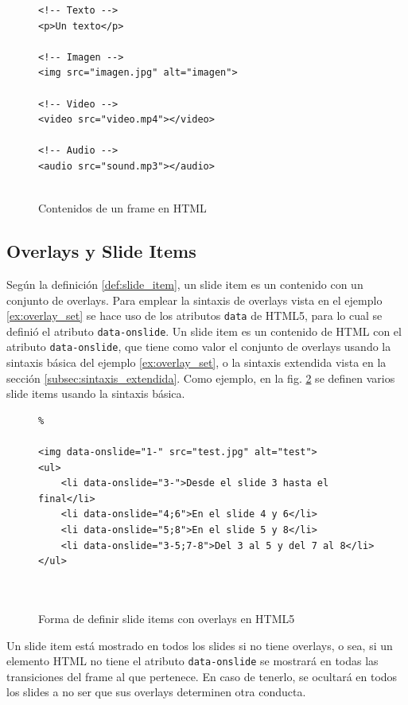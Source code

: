 				\begin{figure}[htb]%

					\begin{lstlisting}						
<!-- Texto -->
<p>Un texto</p>

<!-- Imagen -->
<img src="imagen.jpg" alt="imagen">

<!-- Video -->
<video src="video.mp4"></video>

<!-- Audio -->
<audio src="sound.mp3"></audio>		 							 					
 					 			

					\end{lstlisting}
					\caption{Contenidos de un frame en HTML}
					\label{fig:frames_html_content}
				\end{figure}	  
		


		\subsection{Overlays y Slide Items} %
		\label{sub:slide_items}
			Según la definición \ref{def:slide_item}, un slide item es un contenido con un conjunto de overlays. Para emplear la sintaxis de overlays vista en el ejemplo \ref{ex:overlay_set} se hace uso de los atributos \texttt{data} de HTML5, para lo cual se definió el atributo \texttt{data-onslide}. Un slide item es un contenido de HTML con el atributo \texttt{data-onslide}, que tiene como valor el conjunto de overlays usando la sintaxis básica del ejemplo \ref{ex:overlay_set}, o la sintaxis extendida vista en la sección \ref{subsec:sintaxis_extendida}. Como ejemplo, en la fig. \ref{fig:slide_items_html} se definen varios slide items usando la sintaxis básica.


				\begin{figure}[htb]%
					\begin{lstlisting}%

<img data-onslide="1-" src="test.jpg" alt="test">
<ul>
    <li data-onslide="3-">Desde el slide 3 hasta el final</li>
    <li data-onslide="4;6">En el slide 4 y 6</li>
    <li data-onslide="5;8">En el slide 5 y 8</li>
    <li data-onslide="3-5;7-8">Del 3 al 5 y del 7 al 8</li>
</ul> 

	
					\end{lstlisting}
					\caption{Forma de definir slide items con overlays en HTML5}
					\label{fig:slide_items_html}
				\end{figure}
			Un slide item está mostrado en todos los slides si no tiene overlays, o sea, si un elemento HTML no tiene el atributo \texttt{data-onslide} se mostrará en todas las transiciones del frame al que pertenece. En caso de tenerlo, se ocultará en todos los slides a no ser que sus overlays determinen otra conducta.



